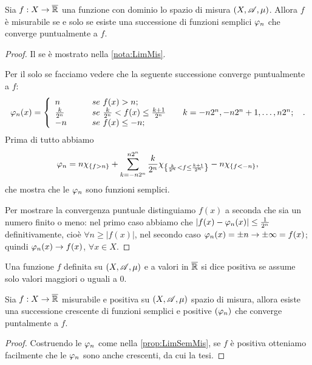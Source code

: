 \begin{proposition}\label{prop:LimSemMis}
	Sia $f:X \rightarrow \overline{\mathbb R}$ una funzione con dominio lo spazio di misura $(X,\mathscr A,\mu)$.
	Allora $f$ è misurabile se e solo se esiste una successione di funzioni semplici $\varphi_n$ che converge puntualmente a $f$.
\end{proposition}
\begin{proof}
	Il se è mostrato nella \cref{nota:LimMis}.
	
	Per il solo se facciamo vedere che la seguente successione converge puntualmente a $f$:
	\[
		\varphi_n(x) =
		\left\{ \begin{array}{ll}
			n &\qquad se\ f(x)>n;\\
			\frac{k}{2^n} &\qquad se\ \frac{k}{2^n}<f(x)\le \frac{k+1}{2^n} \qquad k=-n2^n,-n2^n+1,\dots,n2^n;\\
			-n &\qquad se\ f(x)\le-n;
		\end{array} \right.\ .
	\]
	Prima di tutto abbiamo 
	\[\varphi_n=
		n\chi_{\{f>n\}}+
		\sum_{k=-n2^n}^{n2^n}\frac{k}{2^n}\chi_{\left\{ \frac{k}{2^n}<f\le \frac{k+1}{2^n} \right\}}
		-n\chi_{\{f<-n\}},
	\]
	che mostra che le $\varphi_n$ sono funzioni semplici.
	
	Per mostrare la convergenza puntuale distinguiamo $f(x)$ a seconda che sia un numero finito o meno:
	nel primo caso abbiamo che $|f(x)-\varphi_n(x)|\le \frac{1}{2^n}$ definitivamente, cioè $\forall n\ge |f(x)|$,
	nel secondo caso $\varphi_n(x)=\pm n\rightarrow \pm\infty = f(x)$;
	quindi $\varphi_n(x)\rightarrow f(x)$, $\forall x\in X$.
\end{proof}

\begin{definition}
	Una funzione $f$ definita su $(X,\mathscr A,\mu)$ e a valori in $\overline{\mathbb R}$ si dice positiva se assume solo valori maggiori o uguali a 0.
\end{definition}


\begin{corollary}\label{cor:LimSemCrescMis}
	Sia $f:X\rightarrow \overline{\mathbb R}$ misurabile e positiva su $(X,\mathscr A,\mu)$ spazio di misura, allora esiste una successione crescente di funzioni semplici e positive $(\varphi_n)$ che converge puntalmente a $f$.
\end{corollary}
\begin{proof}
	Costruendo le $\varphi_n$ come nella \cref{prop:LimSemMis}, se $f$ è positiva otteniamo facilmente che le $\varphi_n$ sono anche crescenti, da cui la tesi.
\end{proof}

